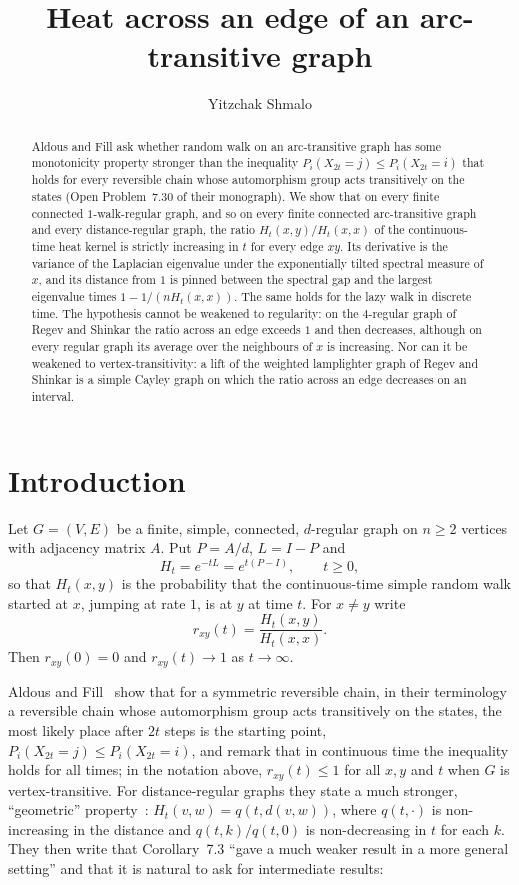 \documentclass[11pt]{amsart}
\title[Heat across an edge]{Heat across an edge of an arc-transitive graph}
\author{Yitzchak Shmalo}
\theoremstyle{definition}
\theoremstyle{remark}
\begin{document}
\begin{abstract}
Aldous and Fill ask whether random walk on an arc-transitive graph has some monotonicity property stronger than the inequality $P_i(X_{2t}=j)\le P_i(X_{2t}=i)$ that holds for every reversible chain whose automorphism group acts transitively on the states (Open Problem~7.30 of their monograph). We show that on every finite connected $1$-walk-regular graph, and so on every finite connected arc-transitive graph and every distance-regular graph, the ratio $H_t(x,y)/H_t(x,x)$ of the continuous-time heat kernel is strictly increasing in $t$ for every edge $xy$. Its derivative is the variance of the Laplacian eigenvalue under the exponentially tilted spectral measure of $x$, and its distance from $1$ is pinned between the spectral gap and the largest eigenvalue times $1-1/(nH_t(x,x))$. The same holds for the lazy walk in discrete time. The hypothesis cannot be weakened to regularity: on the $4$-regular graph of Regev and Shinkar the ratio across an edge exceeds $1$ and then decreases, although on every regular graph its average over the neighbours of $x$ is increasing. Nor can it be weakened to vertex-transitivity: a lift of the weighted lamplighter graph of Regev and Shinkar is a simple Cayley graph on which the ratio across an edge decreases on an interval.
\end{abstract}

\maketitle

\section{Introduction}

Let $G=(V,E)$ be a finite, simple, connected, $d$-regular graph on $n\ge2$ vertices with adjacency matrix $A$. Put $P=A/d$, $L=I-P$ and
\[
H_t=e^{-tL}=e^{t(P-I)},\qquad t\ge0,
\]
so that $H_t(x,y)$ is the probability that the continuous-time simple random walk started at $x$, jumping at rate $1$, is at $y$ at time $t$. For $x\ne y$ write
\[
r_{xy}(t)=\frac{H_t(x,y)}{H_t(x,x)} .
\]
Then $r_{xy}(0)=0$ and $r_{xy}(t)\to1$ as $t\to\infty$.

Aldous and Fill~\cite[Section~7.1.3, Corollary~7.3, p.~241]{AF} show that for a symmetric reversible chain, in their terminology a reversible chain whose automorphism group acts transitively on the states, the most likely place after $2t$ steps is the starting point, $P_i(X_{2t}=j)\le P_i(X_{2t}=i)$, and remark that in continuous time the inequality holds for all times; in the notation above, $r_{xy}(t)\le1$ for all $x,y$ and $t$ when $G$ is vertex-transitive. For distance-regular graphs they state a much stronger, ``geometric'' property~\cite[Proposition~7.29, p.~262]{AF}: $H_t(v,w)=q(t,d(v,w))$, where $q(t,\cdot)$ is non-increasing in the distance and $q(t,k)/q(t,0)$ is non-decreasing in $t$ for each $k$. They then write that Corollary~7.3 ``gave a much weaker result in a more general setting'' and that it is natural to ask for intermediate results:
\end{document}
